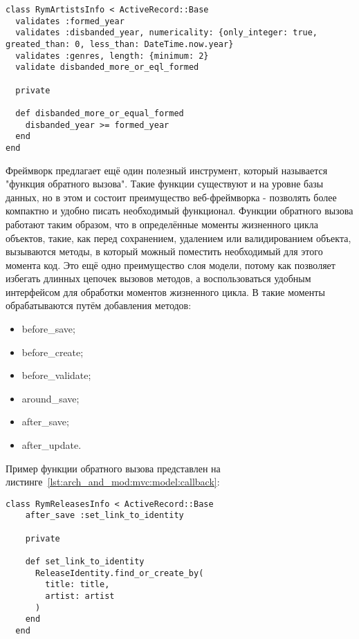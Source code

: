 \begin{lstlisting}[style=fsharpstyle,caption={Реализация валидации в классе RymArtistsInfo}, label=lst:arch_and_mod:mvc:model:rym_artists_info_validations]
class RymArtistsInfo < ActiveRecord::Base
  validates :formed_year
  validates :disbanded_year, numericality: {only_integer: true, greated_than: 0, less_than: DateTime.now.year}
  validates :genres, length: {minimum: 2}
  validate disbanded_more_or_eql_formed

  private

  def disbanded_more_or_equal_formed
    disbanded_year >= formed_year
  end
end
\end{lstlisting}

Фреймворк \ror{} предлагает ещё один полезный инструмент, который называется "функция обратного вызова". Такие функции существуют и на уровне базы данных, но в этом и состоит преимущество веб-фреймворка - позволять более компактно и удобно писать необходимый функционал. Функции обратного вызова работают таким образом, что в определённые моменты жизненного цикла объектов, такие, как перед сохранением, удалением или валидированием объекта, вызываются методы, в который можный поместить необходимый для этого момента код. Это ещё одно преимущество слоя модели, потому как позволяет избегать длинных цепочек вызовов методов, а воспользоваться удобным интерфейсом для обработки моментов жизненного цикла. В \ror{} такие моменты обрабатываются путём добавления методов:
\begin{itemize}
  \item before\_save;
  \item before\_create;
  \item before\_validate;
  \item around\_save;
  \item after\_save;
  \item after\_update.
\end{itemize}

Пример функции обратного вызова представлен на листинге~\ref{lst:arch_and_mod:mvc:model:callback}:

\begin{lstlisting}[style=fsharpstyle,caption={Пример получения артистов по определённым параметрам}, label=lst:arch_and_mod:mvc:model:callback]
  class RymReleasesInfo < ActiveRecord::Base
    after_save :set_link_to_identity

    private

    def set_link_to_identity
      ReleaseIdentity.find_or_create_by(
        title: title,
        artist: artist
      )
    end
  end
\end{lstlisting}

